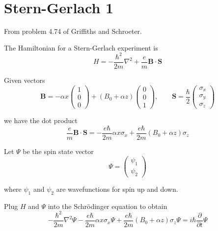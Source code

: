 

\section*{Stern-Gerlach 1}

From problem 4.74 of Griffiths and Schroeter.

\bigskip
The Hamiltonian for a Stern-Gerlach experiment is
\begin{equation*}
H=-\frac{\hbar^2}{2m}\nabla^2+\frac{e}{m}\mathbf B\cdot\mathbf S
\end{equation*}

Given vectors
\begin{equation*}
\mathbf B=-\alpha x\begin{pmatrix}1\\0\\0\end{pmatrix}
+(B_0+\alpha z)\begin{pmatrix}0\\0\\1\end{pmatrix},\qquad
\mathbf S=\frac{\hbar}{2}\begin{pmatrix}\sigma_x\\\sigma_y\\\sigma_z\end{pmatrix}
\end{equation*}

we have the dot product
\begin{equation*}
\frac{e}{m}\mathbf B\cdot\mathbf S
=-\frac{e\hbar}{2m}\alpha x\sigma_x
+\frac{e\hbar}{2m}(B_0+\alpha z)\sigma_z
\end{equation*}

Let $\Psi$ be the spin state vector
\begin{equation*}
\Psi=\begin{pmatrix}\psi_1\\\psi_2\end{pmatrix}
\end{equation*}

where $\psi_1$ and $\psi_2$ are wavefunctions for spin up and down.

\bigskip
Plug $H$ and $\Psi$ into the Schr\"odinger equation to obtain
\begin{equation*}
-\frac{\hbar^2}{2m}\nabla^2\Psi
-\frac{e\hbar}{2m}\alpha x\sigma_x\Psi
+\frac{e\hbar}{2m}(B_0+\alpha z)\sigma_z\Psi
=i\hbar\frac{\partial}{\partial t}\Psi
\end{equation*}


